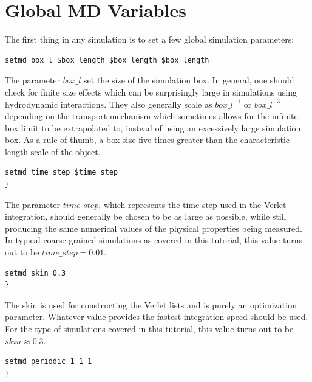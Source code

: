 \documentclass[
paper=a4,                       %
fontsize=11pt,                  %
twoside,                        %
footsepline,                    %
headsepline,                    %
headinclude=false,              %
footinclude=false,              %
pagesize,                       %
]{scrartcl}
\begin{document}
\section{Global MD Variables}\label{sec:espresso}

  The first thing in any \es{} simulation is to set a few global simulation parameters:

{\small\vspace{0,2cm}
\begin{lstlisting} 
setmd box_l $box_length $box_length $box_length
\end{lstlisting}\vspace{0,2cm}
}

The parameter $box\_l$ set the size of the simulation box. In general, one should check for finite
size effects which can be surprisingly large in simulations using hydrodynamic interactions. They
also generally scale as $box\_l^{-1}$ or $box\_l^{-3}$ depending on the transport mechanism
which sometimes allows for the infinite box limit to be extrapolated to, instead of using an
excessively large simulation box. As a rule of thumb, a box size five times greater than the characteristic
length scale of the object. 
{\small\vspace{0,2cm}
\begin{lstlisting}[numbers=none]
setmd time_step $time_step
}\end{lstlisting}\vspace{0,2cm}
}
The parameter $time\_step$, which represents the time step used in the Verlet
integration, should generally be chosen to be as large as possible, while still producing the same numerical
values of the physical properties being measured. In typical coarse-grained simulations as
covered in this tutorial, this value turns out to be $time\_step=0.01$.
{\small\vspace{0,2cm}
\begin{lstlisting}[numbers=none]
setmd skin 0.3
}\end{lstlisting}\vspace{0,2cm}
}
 The skin is used for constructing
the Verlet lists and is purely an optimization parameter. Whatever value provides the fastest
integration speed should be used. For the type of simulations covered in this tutorial, this value turns out
to be $skin \approx 0.3$.
{\small\vspace{0,2cm}
\begin{lstlisting}[numbers=none]
setmd periodic 1 1 1
}\end{lstlisting}\vspace{0,2cm}
}
\end{document}
